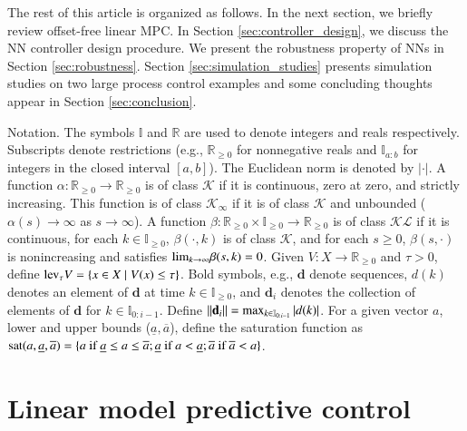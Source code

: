\documentclass[preprint,5p, twocolumn, authoryear]{elsarticle}
\newcommand{\bbI}{\mathbb{I}}
\newcommand{\bbR}{\mathbb{R}}
\newcommand{\norm}[1]{\left| #1 \right|}
\newcommand{\underl}[1]{\underline{#1}} \newcommand{\overl}[1]{\overline{#1}}
\newcommand{\satlb}[1]{\textnormal{sat}(#1, \underline{#1}, \overline{#1})}
\newcommand{\tif}{\textnormal{if}}
\begin{document}
The rest of this article is organized as follows. In the next section, we
briefly review offset-free linear MPC. In Section \ref{sec:controller_design},
we discuss the NN controller design procedure. We present the robustness
property of NNs in Section \ref{sec:robustness}. Section
\ref{sec:simulation_studies} presents simulation studies on two large process
control examples and some concluding thoughts appear in Section
\ref{sec:conclusion}.

Notation. The symbols $\bbI$ and $\bbR$ are used to denote integers and reals
respectively. Subscripts denote restrictions (e.g., $\bbR_{\geq 0}$ for
nonnegative reals and $\bbI_{a:b}$ for integers in the closed interval $[a,
b]$). The Euclidean norm is denoted by $\norm{\cdot}$. A function $\alpha :
\bbR_{\geq 0} \rightarrow \bbR_{\geq 0}$ is of class $\mathcal{K}$ if it is
continuous, zero at zero, and strictly increasing. This function is of class
$\mathcal{K}_{\infty}$ if it is of class $\mathcal{K}$ and unbounded ($\alpha(s)
\rightarrow \infty$ as $s \rightarrow \infty$). A function $\beta : \bbR_{\geq
0} \times \bbI_{\geq 0} \rightarrow \bbR_{\geq 0}$ is of class $\mathcal{KL}$ if
it is continuous, for each $k \in \bbI_{\geq 0}$, $\beta(\cdot, k)$ is of class
$\mathcal{K}$, and for each $s \geq 0$, $\beta(s, \cdot)$ is nonincreasing and
satisfies $\textnormal{lim}_{k \rightarrow \infty} \beta(s, k) = 0$. Given $V :
X \rightarrow \bbR_{\geq 0}$ and $\tau > 0$, define $\textnormal{lev}_{\tau} V =
\{ x \in X \mid V(x) \leq \tau \}$. Bold symbols, e.g., $\mathbf{d}$ denote
sequences, $d(k)$ denotes an element of $\mathbf{d}$ at time $k \in \bbI_{\geq
0}$, and $\mathbf{d}_i$ denotes the collection of elements of $\mathbf{d}$ for
$k \in \bbI_{0:i-1}$. Define $\norm{\norm{\mathbf{d}_i}} = \textnormal{max}_{k
\in \bbI_{0:i-1}} \norm{d(k)}$. For a given vector $a$, lower and upper bounds
($\underl{a}, \overl{a}$), define the saturation function as $\satlb{a} = \{ a \
\tif \ \underl{a} \leq a \leq \overl{a}; \underl{a} \ \tif \ a < \underl{a};
\overl{a} \ \tif \ \overl{a} < a \}$.

\section{Linear model predictive control} \label{sec:mpc}
\end{document}
